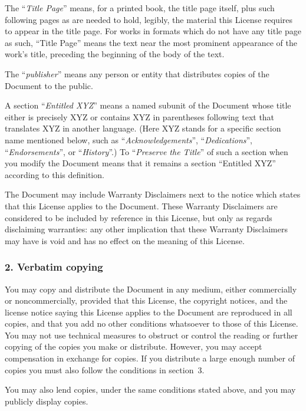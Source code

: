 \documentclass[a4paper,openany,10pt]{book}
\begin{document}
The ``\emph{Title Page}'' means, for a printed book, the title page itself,
plus such following pages as are needed to hold, legibly, the material
this License requires to appear in the title page.  For works in
formats which do not have any title page as such, ``Title Page'' means
the text near the most prominent appearance of the work's title,
preceding the beginning of the body of the text.

The ``\emph{publisher}'' means any person or entity that distributes
copies of the Document to the public.

A section ``\emph{Entitled XYZ}'' means a named subunit of the Document whose
title either is precisely XYZ or contains XYZ in parentheses following
text that translates XYZ in another language.  (Here XYZ stands for a
specific section name mentioned below, such as ``\emph{Acknowledgements}'',
``\emph{Dedications}'', ``\emph{Endorsements}'', or ``\emph{History}''.)  
To ``\emph{Preserve the Title}''
of such a section when you modify the Document means that it remains a
section ``Entitled XYZ'' according to this definition.

The Document may include Warranty Disclaimers next to the notice which
states that this License applies to the Document.  These Warranty
Disclaimers are considered to be included by reference in this
License, but only as regards disclaiming warranties: any other
implication that these Warranty Disclaimers may have is void and has
no effect on the meaning of this License.

\subsubsection*{2. Verbatim copying}

You may copy and distribute the Document in any medium, either
commercially or noncommercially, provided that this License, the
copyright notices, and the license notice saying this License applies
to the Document are reproduced in all copies, and that you add no other
conditions whatsoever to those of this License.  You may not use
technical measures to obstruct or control the reading or further
copying of the copies you make or distribute.  However, you may accept
compensation in exchange for copies.  If you distribute a large enough
number of copies you must also follow the conditions in section~3.

You may also lend copies, under the same conditions stated above, and
you may publicly display copies.
\end{document}
